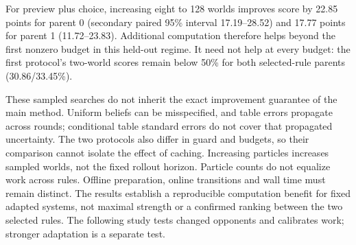 For preview plus choice, increasing eight to 128 worlds improves score by
22.85 points for parent 0 (secondary paired 95\% interval 17.19--28.52) and
17.77 points for parent 1 (11.72--23.83). Additional computation therefore
helps beyond the first nonzero budget in this held-out regime. It need not
help at every budget: the first protocol's two-world scores remain below
50\% for both selected-rule parents (30.86/33.45\%).

These sampled searches do not inherit the exact improvement guarantee of the
main method. Uniform beliefs can be misspecified, and table errors propagate
across rounds; conditional table standard errors do not cover that propagated
uncertainty. The two protocols also differ in guard and budgets, so their
comparison cannot isolate the effect of caching. Increasing particles increases
sampled worlds, not the fixed rollout horizon. Particle counts do not equalize
work across rules. Offline preparation, online transitions and
wall time must remain distinct. The results establish a reproducible
computation benefit for fixed adapted systems, not maximal strength or a
confirmed ranking between the two selected rules. The following study tests
changed opponents and calibrates work; stronger adaptation is a separate test.
